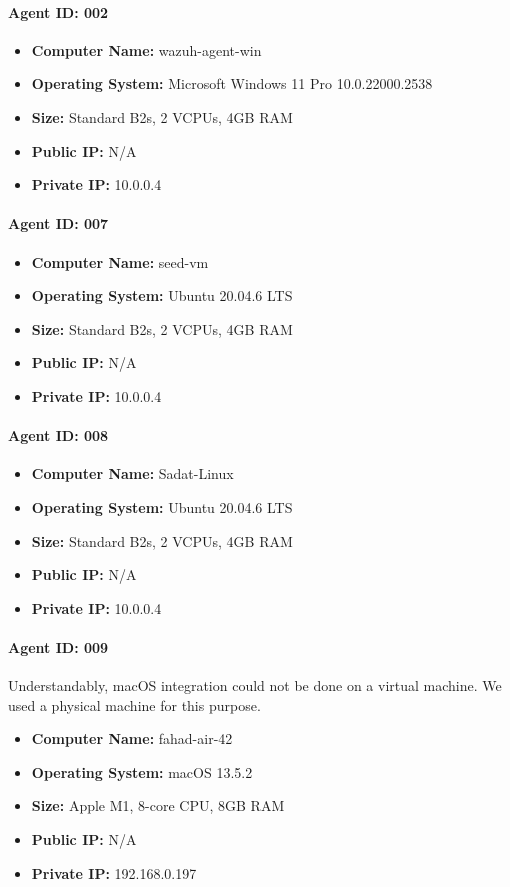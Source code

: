 \paragraph*{Agent ID: 002}
\begin{itemize}
    \item \textbf{Computer Name:} wazuh-agent-win
    \item \textbf{Operating System:} Microsoft Windows 11 Pro 10.0.22000.2538
    \item \textbf{Size:} Standard B2s, 2 VCPUs, 4GB RAM
    \item \textbf{Public IP:} N/A
    \item \textbf{Private IP:} 10.0.0.4
\end{itemize}

\paragraph*{Agent ID: 007}
\begin{itemize}
    \item \textbf{Computer Name:} seed-vm
    \item \textbf{Operating System:} Ubuntu 20.04.6 LTS
    \item \textbf{Size:} Standard B2s, 2 VCPUs, 4GB RAM
    \item \textbf{Public IP:} N/A
    \item \textbf{Private IP:} 10.0.0.4
\end{itemize}


\paragraph*{Agent ID: 008}
\begin{itemize}
    \item \textbf{Computer Name:} Sadat-Linux
    \item \textbf{Operating System:} Ubuntu 20.04.6 LTS
    \item \textbf{Size:} Standard B2s, 2 VCPUs, 4GB RAM
    \item \textbf{Public IP:} N/A
    \item \textbf{Private IP:} 10.0.0.4
\end{itemize}

\paragraph*{Agent ID: 009}
Understandably, macOS integration could not be done on a virtual machine. We used a physical machine for this purpose.
\begin{itemize}
    \item \textbf{Computer Name:} fahad-air-42
    \item \textbf{Operating System:} macOS 13.5.2
    \item \textbf{Size:} Apple M1, 8-core CPU, 8GB RAM
    \item \textbf{Public IP:} N/A
    \item \textbf{Private IP:} 192.168.0.197
\end{itemize}



